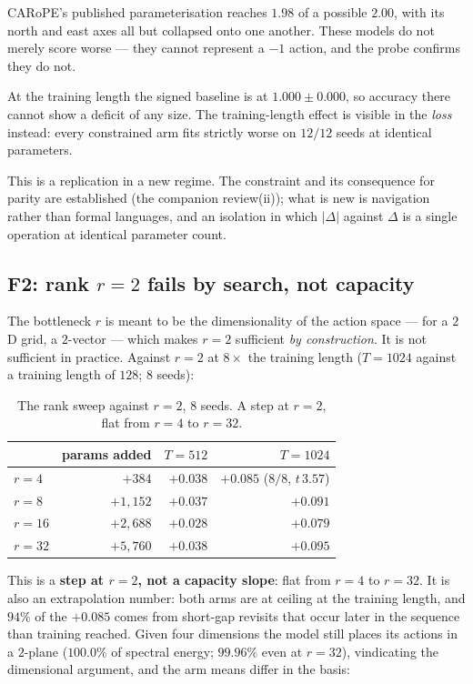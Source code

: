 \documentclass[11pt]{article}
\begin{document}
\noindent CARoPE's published parameterisation reaches $1.98$ of a possible $2.00$,
with its north and east axes all but collapsed onto one another. These models do not
merely score worse --- they cannot represent a $-1$ action, and the probe confirms
they do not.

At the training length the signed baseline is at $1.000\pm0.000$,
so accuracy there cannot show a deficit of any size. The training-length effect is
visible in the \emph{loss} instead: every constrained arm fits strictly worse on
$12/12$ seeds at identical parameters.

This is a replication in a new regime. The constraint and its
consequence for parity are established (the companion review(ii)); what is new is
navigation rather than formal languages, and an isolation in which $|\Delta|$ against
$\Delta$ is a single operation at identical parameter count.

\subsection{F2: rank $r=2$ fails by search, not capacity}
\label{sec:rankmeas}

The bottleneck $r$ is meant to be the dimensionality of the action space --- for a
$2$D grid, a $2$-vector --- which makes $r=2$ sufficient \emph{by construction}. It is
not sufficient in practice. Against $r=2$ at $8\times$ the training length ($T=1024$
against a training length of $128$; $8$ seeds):

\begin{table}[htbp]\centering\small
\caption{The rank sweep against $r=2$, $8$ seeds. A step at $r=2$, flat from $r=4$ to $r=32$.}
\label{tab:rank}
\begin{tabular}{lrrr}
\toprule
 & params added & $T{=}512$ & $T{=}1024$ \\
\midrule
$r=4$  & $+384$    & $+0.038$ & $\mathbf{+0.085}$ ($8/8$, $t\,3.57$) \\
$r=8$  & $+1{,}152$ & $+0.037$ & $+0.091$ \\
$r=16$ & $+2{,}688$ & $+0.028$ & $+0.079$ \\
$r=32$ & $+5{,}760$ & $+0.038$ & $+0.095$ \\
\bottomrule
\end{tabular}
\end{table}

\noindent This is a \textbf{step at $r=2$, not a capacity slope}: flat from $r=4$ to
$r=32$. It is also an extrapolation number: both arms are at ceiling at the training
length, and $94\%$ of the $+0.085$ comes from short-gap revisits that occur later in
the sequence than training reached. Given four dimensions the model still places its
actions in a $2$-plane ($100.0\%$ of spectral energy; $99.96\%$ even at $r=32$),
vindicating the dimensional argument, and the arm means differ in the basis:
\end{document}
